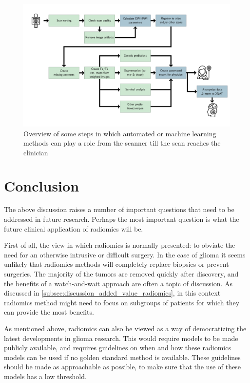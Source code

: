 \begin{figure}[htbp]
\includegraphics[width=\textwidth]{Figures/Pipeline.png}
\caption{Overview of some steps in which automated or machine learning methods can play a role from the scanner till the scan reaches the clinician}\label{fig:discussion_pipeline_automatic}
\end{figure}



\section{Conclusion}\label{sec:discussion_conclusion}


The above discussion raises a number of important questions that need to be addressed in future research.
Perhaps the most important question is what the future clinical application of radiomics will be.


First of all, the view in which radiomics is normally presented: to obviate the need for an otherwise intrusive or difficult surgery.
In the case of glioma it seems unlikely that radiomics methods will completely replace biopsies or prevent surgeries.
The majority of the \glspl{tumor} are removed quickly after discovery, and the benefits of a watch-and-wait approach are often a topic of discussion.
As discussed in \cref{subsec:discussion_added_value_radiomics}, in this context radiomics method might need to focus on subgroups of patients for which they can provide the most benefits.

As mentioned above, radiomics can also be viewed as a way of democratizing the latest  developments in glioma research.
This would require models to be made publicly available, and requires guidelines on when and how these radiomics models can be used if no golden standard method is available.
These guidelines should be made as approachable as possible, to make sure that the use of these models has a low threshold.

